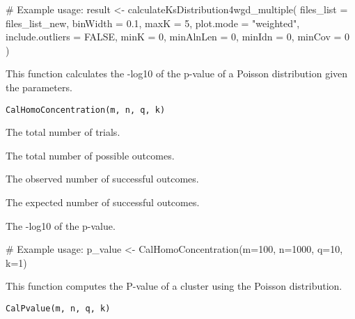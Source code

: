 \documentclass[a4paper]{book}
\begin{document}
%
\begin{Examples}
\begin{ExampleCode}
# Example usage:
result <- calculateKsDistribution4wgd_multiple(
    files_list = files_list_new,
    binWidth = 0.1,
    maxK = 5,
    plot.mode = "weighted",
    include.outliers = FALSE,
    minK = 0,
    minAlnLen = 0,
    minIdn = 0,
    minCov = 0
)
\end{ExampleCode}
\end{Examples}
%
\begin{Description}\relax
This function calculates the -log10 of the p-value of a Poisson distribution given the parameters.
\end{Description}
%
\begin{Usage}
\begin{verbatim}
CalHomoConcentration(m, n, q, k)
\end{verbatim}
\end{Usage}
%
\begin{Arguments}
\begin{ldescription}
\item[\code{m}] The total number of trials.

\item[\code{n}] The total number of possible outcomes.

\item[\code{q}] The observed number of successful outcomes.

\item[\code{k}] The expected number of successful outcomes.
\end{ldescription}
\end{Arguments}
%
\begin{Value}
The -log10 of the p-value.
\end{Value}
%
\begin{Examples}
\begin{ExampleCode}
# Example usage:
p_value <- CalHomoConcentration(m=100, n=1000, q=10, k=1)
\end{ExampleCode}
\end{Examples}
%
\begin{Description}\relax
This function computes the P-value of a cluster using the Poisson distribution.
\end{Description}
%
\begin{Usage}
\begin{verbatim}
CalPvalue(m, n, q, k)
\end{verbatim}
\end{Usage}
\end{document}

